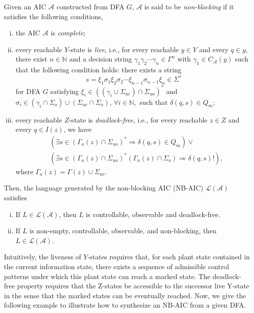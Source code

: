 \documentclass[journal,twoside,web]{ieeecolor}
\begin{document}
\begin{theorem}\label{theo:nb_aic}
Given an AIC $\mathcal{A}$ constructed from DFA $G$, $\mathcal{A}$ is said to be \emph{non-blocking} if it satisfies the following conditions,
\begin{enumerate}[(i)]
    \item the AIC $\mathcal{A}$ is \emph{complete};
    \item every reachable $Y$-state is \emph{live}, i.e., for every reachable
    $y\in Y$ and every $q\in y$, there exist $n \in \mathbb{N}$ and a decision
    string $\gamma_1 \gamma_2 \cdots \gamma_n \in \Gamma^n$ with
    $\gamma_1\in C_{\mathcal{A}}(y)$ such that the following condition holds:
    there exists a string
    $$
        s=\xi_1 \sigma_1 \xi_2 \sigma_2 \cdots \xi_{n-1} \sigma_{n-1} \xi_n \in \Sigma^*
    $$
    for DFA $G$
    satisfying $\xi_i \in ((\gamma_i \cup \Sigma_{uc}) \cap \Sigma_{uo})^*$
    and $\sigma_i \in (\gamma_i \cap \Sigma_o) \cup (\Sigma_{uc} \cap \Sigma_o)$,
    $\forall i \in \mathbb{N},$
    such that
    $
        \delta(q,s) \in Q_m;
    $
    \item every reachable $Z$-state is \emph{deadlock-free}, i.e., for every
    reachable $z\in Z$ and every $q\in I(z)$, we have    
    $$
    \begin{aligned}
    &(\exists s \in (\Gamma_a(z) \cap \Sigma_{uo})^* \Rightarrow \delta(q, s) \in Q_m) \vee \\
    &(\exists s \in (\Gamma_a(z) \cap \Sigma_{uo})^*(\Gamma_a(z) \cap \Sigma_o) \Rightarrow \delta(q, s)!),
    \end{aligned}
    $$
    where $\Gamma_a(z) = \Gamma(z) \cup \Sigma_{uc}$.   
\end{enumerate}
Then, the language generated by the non-blocking AIC (NB-AIC) $\mathcal{L}(\mathcal{A})$ satisfies
\begin{enumerate}[(i)]
    \item If $L \in \mathcal{L}(\mathcal{A})$, then $L$ is controllable, observable and deadlock-free.
    \item If $L$ is non-empty, controllable, observable, and non-blocking, then $L \in \mathcal{L}(\mathcal{A})$.
\end{enumerate}
\end{theorem}
Intuitively, the liveness of $Y$-states requires that, for each plant state
contained in the current information state, there exists a sequence of
admissible control patterns under which this plant state can reach a marked
state. 
The deadlock-free property requires that the Z-states be accessible to the successor live Y-state in the sense that the marked states can be eventually reached.
%
Now, we give the following example to illustrate how to synthesize an NB-AIC from a given DFA.
\end{document}

